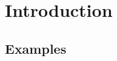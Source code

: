 \chapter{Introduction}

\lipsum[1]

\section{Examples}
\lipsum[1-2]

\begin{definition}
	\lipsum[1]
\end{definition}

\begin{theorem}
	\lipsum[1]
\end{theorem}

\begin{example}
	\lipsum[1-2]
\end{example}

